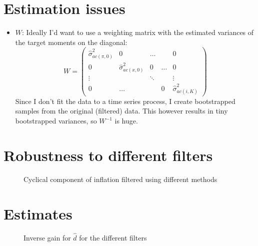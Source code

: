 \documentclass[11pt]{article}
\def \myFigPath {../figures/}
\renewcommand{\[}{\begin{equation}}
\renewcommand{\]}{\end{equation}}
\def\myAdjustableFigScale{0.13}
\begin{document}
\section{Estimation issues}
\begin{itemize}
\item $W$:
Ideally I'd want to use a weighting matrix with the estimated variances of the target moments on the diagonal:
\begin{equation}
W = \begin{pmatrix} \hat{\sigma}^2_{ac(\pi,0)} & 0 &\dots &   & 0 \\
 0 & \hat{\sigma}^2_{ac(x,0)} & 0 & \dots & 0 \\
 \vdots & & \ddots & & \vdots \\
 0 & \dots &  & 0 & \hat{\sigma}^2_{ac(i,K)}
\end{pmatrix}
\end{equation}
Since I don't fit the data to a time series process, I create bootstrapped samples from the original (filtered) data. This however results in tiny bootstrapped variances, so $W^{-1}$ is huge. 

\end{itemize}


\section{Robustness to different filters}
\begin{figure}[h!]
\caption{Cyclical component of inflation filtered using different methods}
\end{figure}

\newpage
\section{Estimates}

\begin{figure}[h!]
\caption{Inverse gain for $\hat{d}$ for the different filters}
\end{figure}
\end{document}
